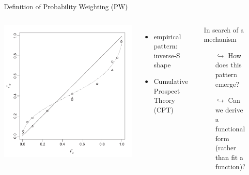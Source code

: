 \begin{frame}{Definition of Probability Weighting (PW)}

\begin{columns}%
{\centering	\includegraphics[width=.9\textwidth]{../../figs/TK1992.pdf} }
\parencite[p. 310, Fig. 1,relabelled axes]{TverskyKahneman1992}

\begin{itemize}
  \item empirical pattern: inverse-S shape
  \item Cumulative Prospect Theory (CPT) \nocite{}
\end{itemize}
\vspace{1em}
\bi
	\item	{}
\ei
\vspace{1em}
\begin{block}{In search of a mechanism}
	\begin{itemize}
	  \item[$\hookrightarrow$] How does this pattern emerge?
  	\item[$\hookrightarrow$] Can we derive a functional form\\ 
	(rather than fit a function)?
	\end{itemize}
\end{block}

\end{columns}
\end{frame}


